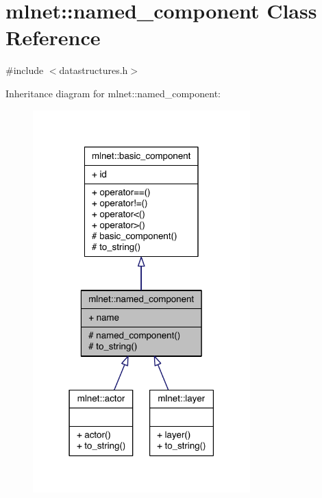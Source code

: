 \hypertarget{classmlnet_1_1named__component}{\section{mlnet\+:\+:named\+\_\+component Class Reference}
\label{classmlnet_1_1named__component}
}


{\ttfamily \#include $<$datastructures.\+h$>$}



Inheritance diagram for mlnet\+:\+:named\+\_\+component\+:\nopagebreak
\begin{figure}[H]
\begin{center}
\leavevmode
\includegraphics[width=238pt]{classmlnet_1_1named__component__inherit__graph}
\end{center}
\end{figure}


